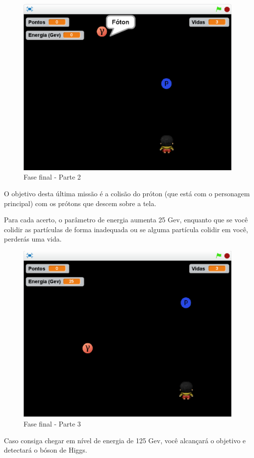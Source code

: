 \documentclass[12pt,fleqn]{book} %
\begin{document}
\begin{figure}[h]
	\centering
	\includegraphics[width=0.65 \textwidth]{Produto/final2}
	\caption{Fase final - Parte 2}
	\label{fig:app_a:final2}
\end{figure}

\newpage

O objetivo desta última missão é a colisão do próton (que está com o personagem principal) com os prótons que descem sobre a tela.

Para cada acerto, o parâmetro de energia aumenta 25 Gev, enquanto que se você colidir as partículas de forma inadequada ou se alguma partícula colidir em você, perderás uma vida.

\begin{figure}[h]
	\centering
	\includegraphics[width=0.65 \textwidth]{Produto/final3}
	\caption{Fase final - Parte 3}
	\label{fig:app_a:final3}
\end{figure}


Caso consiga chegar em nível de energia de 125 Gev, você alcançará o objetivo e detectará o bóson de Higgs.
\end{document}
